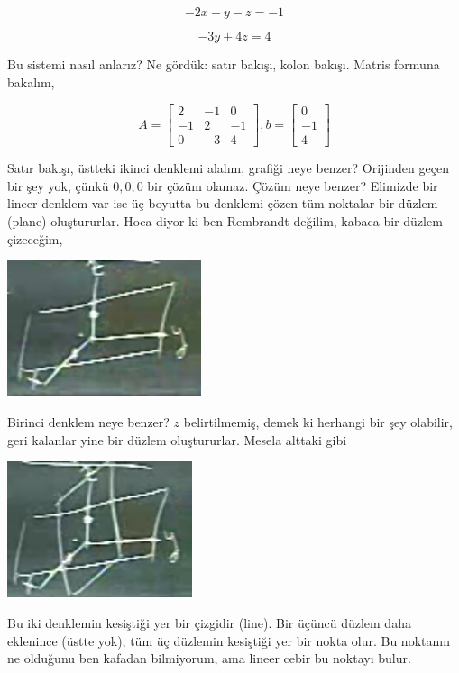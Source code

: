 \documentclass[12pt,fleqn]{article}\usepackage{../../common}
\begin{document}
$$ -2x + y - z = -1 $$

$$ -3y + 4z = 4 $$

Bu sistemi nasıl anlarız? Ne gördük: satır bakışı, kolon bakışı. Matris
formuna bakalım, 

$$ A = 
\left[\begin{array}{rrr}
2 & -1 & 0 \\
-1 & 2 & -1 \\
0 & -3 & 4 
\end{array}\right]
,
b = 
\left[\begin{array}{r}
0  \\
-1 \\
4  
\end{array}\right]
 $$

Satır bakışı, üstteki ikinci denklemi alalım, grafiği neye benzer?
Orijinden geçen bir şey yok, çünkü $0,0,0$ bir çözüm olamaz. Çözüm neye
benzer? Elimizde bir lineer denklem var ise üç boyutta bu denklemi çözen
tüm noktalar bir düzlem (plane) oluştururlar. Hoca diyor ki ben Rembrandt
değilim, kabaca bir düzlem çizeceğim, 

\includegraphics[height=4cm]{1_06.png}

Birinci denklem neye benzer? $z$ belirtilmemiş, demek ki herhangi bir şey
olabilir, geri kalanlar yine bir düzlem oluştururlar. Mesela alttaki gibi

\includegraphics[height=4cm]{1_07.png}

Bu iki denklemin kesiştiği yer bir çizgidir (line). Bir üçüncü düzlem daha
eklenince (üstte yok), tüm üç düzlemin kesiştiği yer bir nokta olur. Bu
noktanın ne olduğunu ben kafadan bilmiyorum, ama lineer cebir bu noktayı
bulur.
\end{document}
